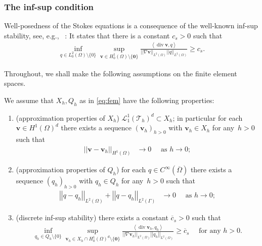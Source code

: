 \documentclass[reqno,a4paper]{amsart}
\def\norm#1{\left|\!\left| #1 \right|\!\right|}
\def\ll{\left\langle}
\def\rr{\right\rangle}
\def\vec#1{\boldsymbol{#1}}
\def\diver{\mathop{\mathrm{div}}\nolimits} %
\def\b0{\vec{0}}
\def\bv{\vec{v}}
\def\Xh{X_{h}}
\def\tria{\mathcal{T}_h}
\begin{document}
\subsubsection{The inf-sup condition}
\label{sec:prelim-infsup}	
Well-posedness of the Stokes equations is a consequence of the well-known inf-sup stability, see, e.g.,~ \cite{BBF.2013}: 
It states that there is a constant $c_s>0$ such that 
\begin{align}\label{est:inf-sup-const} 
	\inf_{q \in L^{2}_0(\Omega)\setminus \{0\}} \sup_{ \bv \in H^1_{0}(\Omega) \setminus\{\b0\}} \frac{\ll \diver \bv, q \rr}{\norm{ \nabla \bv}_{L^{2}(\Omega)} \norm{q}_{L^{2}(\Omega)}} \geq c_{s}. 
\end{align}

Throughout, we shall make the following assumptions on the finite element spaces. 
\begin{assumption}\label{assump:fem}
	We assume that $\Xh, Q_h$ as in \eqref{eq:fem} have the following properties: 
	\begin{enumerate}[label = (\roman*)]
		\item 
		(approximation properties of $X_h$)
		\label{itm:fem-X-approx} $\mathcal{L}^1_1(\tria)^d \subset \Xh$; in particular
		for each $\bv \in H^1(\Omega)^d$ there exists a sequence $(\bv_{h})_{h >0}$ with $\bv_h \in \Xh$ for any~$h>0$ such that 
		\begin{align*}
			\norm{\bv - \bv_h}_{H^1(\Omega)}& \to 0 \quad \text{ as } h \to 0;
		\end{align*}  
		\item (approximation properties of $Q_h$) 
		\label{itm:fem-Q-approx} 
		for each $q \in C^\infty(\overline \Omega)$ there exists a sequence $(q_{h})_{h >0}$ with $q_h \in Q_h$ for any~$h>0$ such that 
		\begin{align*}
			\norm{q - q_h}_{L^2(\Omega)} + \norm{q - q_h}_{L^2(\Gamma)}
			& \to 0 \quad \text{ as } h \to 0;
		\end{align*} 
		\item \label{itm:d-inf-sup-H10} 
		(discrete inf-sup stability) 
		there exists a constant $\overline{c}_s>0$ such that 
		\begin{align*}%
			\inf_{q_h \in Q_h \setminus \{0\}} \sup_{\bv_h \in \Xh \cap H^1_0(\Omega)^d  \setminus \{\b0\}} \frac{\ll \diver \bv_h, q_h \rr }{\norm{\nabla \bv_h}_{L^2(\Omega)} \norm{q_h}_{L^2(\Omega)}} \geq \overline{c}_s \quad \text{ for any } h > 0.
		\end{align*}
	\end{enumerate} 
\end{assumption}
\end{document}
